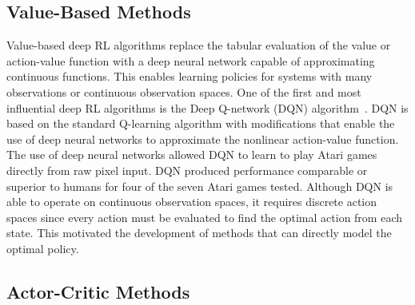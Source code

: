 \subsection{Value-Based Methods}
Value-based deep RL algorithms replace the tabular evaluation of the value or action-value function with a deep neural network capable of approximating continuous functions. This enables learning policies for systems with many observations or continuous observation spaces.
%
One of the first and most influential deep RL algorithms is the Deep Q-network (DQN) algorithm~\cite{Mnih:2013a,Mnih:2015a}.
DQN is based on the standard Q-learning algorithm with modifications that enable the use of deep neural networks to approximate the nonlinear action-value function.
%
%
The use of deep neural networks allowed DQN to learn to play Atari games directly from raw pixel input. 
%
DQN produced performance comparable or superior to humans for four of the seven Atari games tested.
%
%
Although DQN is able to operate on continuous observation spaces, it requires discrete action spaces since every action must be evaluated to find the optimal action from each state. This motivated the development of methods that can directly model the optimal policy.

\subsection{Actor-Critic Methods}

